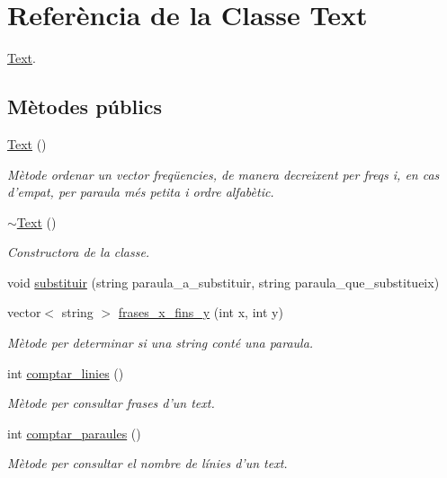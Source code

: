 \hypertarget{class_text}{\section{Referència de la Classe Text}
\label{class_text}
}


\hyperlink{class_text}{Text}.  


\subsection*{Mètodes públics}
\begin{DoxyCompactItemize}
\item 
\hyperlink{class_text_ab3e26143fccc52699bcc5149cae852bc}{Text} ()
\begin{DoxyCompactList}\small\item\em Mètode ordenar un vector freqüencies, de manera decreixent per freqs i, en cas d'empat, per paraula més petita i ordre alfabètic. \end{DoxyCompactList}\item 
\hyperlink{class_text_a2d49e5c280e205125b149f7777ae30c7}{$\sim$\+Text} ()
\begin{DoxyCompactList}\small\item\em Constructora de la classe. \end{DoxyCompactList}\item 
void \hyperlink{class_text_a2c90f81b63e3d0b1fbef2cc68d1e41bd}{substituir} (string paraula\+\_\+a\+\_\+substituir, string paraula\+\_\+que\+\_\+substitueix)
\item 
vector$<$ string $>$ \hyperlink{class_text_a72f045bd50c4b5ea7d8697f71a4f72ee}{frases\+\_\+x\+\_\+fins\+\_\+y} (int x, int y)
\begin{DoxyCompactList}\small\item\em Mètode per determinar si una string conté una paraula. \end{DoxyCompactList}\item 
int \hyperlink{class_text_a9e70c8b7ca58a9f73060d524c9b4e474}{comptar\+\_\+linies} ()
\begin{DoxyCompactList}\small\item\em Mètode per consultar frases d'un text. \end{DoxyCompactList}\item 
int \hyperlink{class_text_a334760b16b71f1fec0ce9b7f8f86788a}{comptar\+\_\+paraules} ()
\begin{DoxyCompactList}\small\item\em Mètode per consultar el nombre de línies d'un text. \end{DoxyCompactList}\item 

\end{DoxyCompactItemize}
